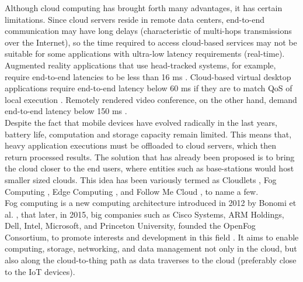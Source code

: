 \noindent\tab Although cloud computing has brought forth many advantages, it has certain limitations. Since cloud servers reside in remote data centers, end-to-end communication may have long delays (characteristic of multi-hops transmissions over the Internet), so the time required to access cloud-based services may not be suitable for some applications with ultra-low latency requirements (real-time). Augmented reality applications that use head-tracked systems, for example, require end-to-end latencies to be less than 16 ms \cite{ellis2004generalizeability}. Cloud-based virtual desktop applications require end-to-end latency below 60 ms if they are to match QoS of local execution \cite{taylor2015virtual}. Remotely rendered video conference, on the other hand, demand end-to-end latency below 150 ms \cite{szigeti2005end}.\\
\noindent\tab Despite the fact that mobile devices have evolved radically in the last years, battery life, computation and storage capacity remain limited. This means that, heavy application executions must be offloaded to cloud servers, which then return processed results. The solution that has already been proposed is to bring the cloud closer to the end users, where entities such as base-stations would host smaller sized clouds. This idea has been variously termed as Cloudlets \cite{satyanarayanan2013cloudlets}, Fog Computing \cite{bonomi2012fog}, Edge Computing \cite{davy2014challenges}, and Follow Me Cloud \cite{taleb2013follow}, to name a few.\\
\noindent\tab Fog computing is a new computing architecture introduced in 2012 by Bonomi et al. \cite{bonomi2012fog}, that later, in 2015, big companies such as Cisco Systems, ARM Holdings, Dell, Intel, Microsoft, and Princeton University, founded the OpenFog Consortium, to promote interests and development in this field \cite{msv_2016}. It aims to enable computing, storage, networking, and data management not only in the cloud, but also along the cloud-to-thing path as data traverses to the cloud (preferably close to the IoT devices).

